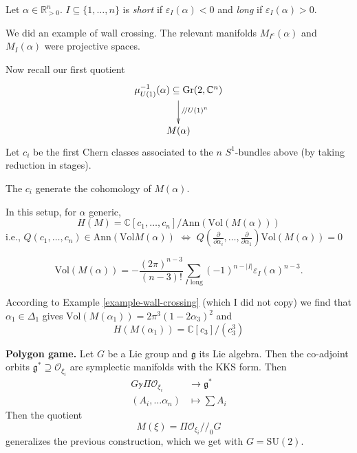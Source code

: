 {\begin{definition}
\label{definition-short-and-long}
Let $\alpha \in \mathbb{R}^n_{>0}$.
$I \subseteq \{1,\ldots,n\}$ is {\it short} 
if $\varepsilon_I(\alpha)<0$ and {\it long}
if  $\varepsilon_I(\alpha)>0$.
\end{definition}

\begin{example}
\label{example-wall-crossing}
We did an example of wall crossing.
The relevant manifolds $M_{I^c}(\alpha)$ and $M_I(\alpha)$ 
were projective spaces.
\end{example}

\medskip\noindent
Now recall our first quotient
$$
\xymatrix{
\mu_{U(1)}^{-1}(\alpha)\subseteq \text{Gr}(2,\mathbb{C}^n)
\ar[d]^{/\!/U(1)^n}\\
M(\alpha)
}
$$
Let $c_i$ be the first Chern
classes associated to the
$n$ $S^1$-bundles above
(by taking reduction in stages).

\begin{theorem}
\label{theorem-Haussmann-Knutson-M}
The $c_i$ generate the cohomology of $M(\alpha)$.
\end{theorem}

\begin{theorem}
\label{theorem-Guillemin-Stenberg}
In this setup, for $\alpha$ generic,
$$
H(M)=\mathbb{C}[c_1,\ldots,c_n]/\text{Ann}(\text{Vol}(M(\alpha)))
$$
i.e., $Q(c_1,\ldots,c_n) \in \text{Ann}(\text{Vol}M(\alpha))$ 
$\iff$ $Q\left(\frac{\partial }{\partial \alpha_i},\ldots,
\frac{\partial }{\partial \alpha_1}\right)
\text{Vol}(M(\alpha))=0$
\end{theorem}

\begin{theorem}
\label{theorem-Takakura-The-Koi}
$$
\text{Vol}(M(\alpha))
=-\frac{(2\pi)^{n-3}}{(n-3)!}
\sum_{I\text{ long}}(-1)^{n-|I|}\varepsilon_I(\alpha)^{n-3}.
$$
\end{theorem}

\begin{example}
\label{example-Delta1}
According to Example \ref{example-wall-crossing} (which I
did not copy) we find that
$\alpha_1 \in \Delta_1$ gives $\text{Vol}(M(\alpha_1))=2\pi^3(1-2\alpha_3)^2$
and
$$
H(M(\alpha_1))=\mathbb{C}[c_3]/(c_3^3)
$$
\end{example}

\medskip\noindent
{\bf Polygon game.}
Let $G$ be a Lie group and $\mathfrak{g}$ its Lie algebra.
Then the co-adjoint orbits
$\mathfrak{g}^*  \supseteq \mathcal{O}_{\xi_i}$ 
are symplectic manifolds with the KKS form.
Then
\begin{align*}
G\mathbb{y} \Pi \mathcal{O}_{\xi_i}  &\longrightarrow \mathfrak{g}^* \\
(A_i,\ldots\alpha_n) &\longmapsto \sum A_i
\end{align*}
Then the quotient
$$
M(\xi)=\Pi \mathcal{O}_{\xi_i}/\!/_0 G
$$
generalizes the previous construction,
which we get with $G=\text{SU}(2)$.

}
